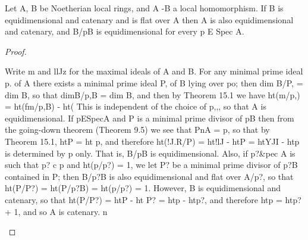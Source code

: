 \begin{theorem}[Theorem 31.5]\label{mcrt-auto-theorem-31-5}
\begin{mathematicalrecord}
Let A, B be Noetherian local rings, and A -B         a local
homomorphism.      If B is equidimensional and catenary and is flat over A
then A is also equidimensional and catenary, and B/pB is equidimensional
for every p E Spec A.
\end{mathematicalrecord}
\end{theorem}
\begin{proof}
\begin{mathematicalrecord}
Write m and llJz for the maximal ideals of A and B. For any minimal
prime ideal p. of A there exists a minimal prime ideal P, of B lying over
po; then dim B/P, = dim B, so that dimB/p,B         = dim B, and then by
Theorem 15.1 we have
         ht(m/p,) = ht(fm/p,B) - ht(%
This is independent of the choice of p,,, so that A is equidimensional.   If
pESpecA and P is a minimal prime divisor of pB then from the
going-down theorem (Theorem 9.5) we see that PnA = p, so that by
Theorem 15.1, htP = ht p, and therefore ht(!J.R/P) = ht!lJ - htP = htYJI -
htp is determined by p only. That is, B/pB is equidimensional.      Also, if
p?&pec A is such that p? c p and ht(p/p?) = 1, we let P? be a minimal
prime divisor of p?B contained in P; then B/p?B is also equidimensional
and flat over A/p?, so that ht(P/P?) = ht(P/p?B) = ht(p/p?) = 1. However,
B is equidimensional     and catenary, so that ht(P/P?) = htP - ht P? =
htp - htp?, and therefore htp = htp? + 1, and so A is catenary. n
\end{mathematicalrecord}
\end{proof}


